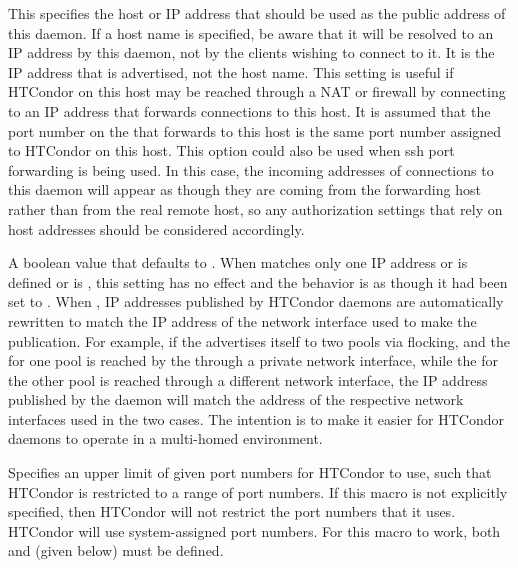\begin{description}
\label{param:TcpForwardingHost}
\item[\Macro{TCP\_FORWARDING\_HOST}]
  This specifies the host or IP address that should be used as the
  public address of this daemon.  If a host name is specified, be aware
  that it will be resolved to an IP address by this daemon, not by the clients
  wishing to connect to it.  It is the IP address that is advertised, not
  the host name.  This setting is useful if HTCondor on this
  host may be reached through a NAT or firewall by connecting to an
  IP address that forwards connections to this host.  It
  is assumed that the port number on the 
  that forwards to this host is the same port number assigned to
  HTCondor on this host.  This option could also be used when ssh port
  forwarding is being used.  In this case, the incoming addresses
  of connections to this daemon will appear as though they are coming
  from the forwarding host rather than from the real remote host, so any
  authorization settings that rely on host addresses should be
  considered accordingly.

\label{param:EnableAddressRewriting}
\item[\Macro{ENABLE\_ADDRESS\_REWRITING}]
  A boolean value that defaults to .  When
   matches only one IP address or
   is defined or
   is , this setting has no effect and
  the behavior is as though it had been set to .  When ,
  IP addresses published by HTCondor daemons are automatically rewritten to
  match the IP address of the network interface used to make the
  publication.  For example, if the  advertises itself to
  two pools via flocking, and the  for one pool is reached
  by the  through a private network interface, while
  the  for the other pool is reached through a different
  network interface, the IP address published by the 
  daemon will match the address of the respective network interfaces
  used in the two cases.  The intention is to make it easier for
  HTCondor daemons to operate in a multi-homed environment.

\label{param:HighPort}
\item[\Macro{HIGHPORT}]
  Specifies an upper limit of given port numbers for HTCondor to use,
  such that HTCondor is restricted to a range of port numbers.
  If this macro is not explicitly specified, then HTCondor will
  not restrict the port numbers that it uses. HTCondor will use
  system-assigned port numbers.
  For this macro to work, both  and
   (given below) must be defined.


\end{description}
